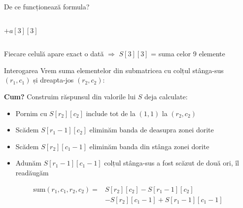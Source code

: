 \documentclass{beamer}
\begin{document}
\begin{frame}{De ce funcționează formula?}
\begin{columns}[c]
    \centering
    {\footnotesize $+a[3][3]$}
    \begin{center}
    \end{center}
  \end{columns}

  \vfill
  \begin{center}
    \small Fiecare celulă apare exact o dată $\Rightarrow$ $S[3][3]$ = suma celor 9 elemente \checkmark
  \end{center}
\end{frame}

\begin{frame}[shrink]{Interogarea}
  Vrem suma elementelor din submatricea cu colțul stânga-sus $(r_1,c_1)$ și dreapta-jos $(r_2,c_2)$:

  \smallskip
  \textbf{Cum?} Construim răspunsul din valorile lui $S$ deja calculate:
  \begin{itemize}
    \item Pornim cu $S[r_2][c_2]$ \textemdash{} include tot de la $(1,1)$ la $(r_2,c_2)$
    \item Scădem $S[r_1{-}1][c_2]$ \textemdash{} eliminăm banda de deasupra zonei dorite
    \item Scădem $S[r_2][c_1{-}1]$ \textemdash{} eliminăm banda din stânga zonei dorite
    \item Adunăm $S[r_1{-}1][c_1{-}1]$ \textemdash{} colțul stânga-sus a fost scăzut de două ori, îl readăugăm
  \end{itemize}

  \begin{align*}
    \mathrm{sum}(r_1,c_1,r_2,c_2) = {}&S[r_2][c_2] - S[r_1{-}1][c_2]\\
    &- S[r_2][c_1{-}1] + S[r_1{-}1][c_1{-}1]
  \end{align*}
\end{frame}
\end{document}

